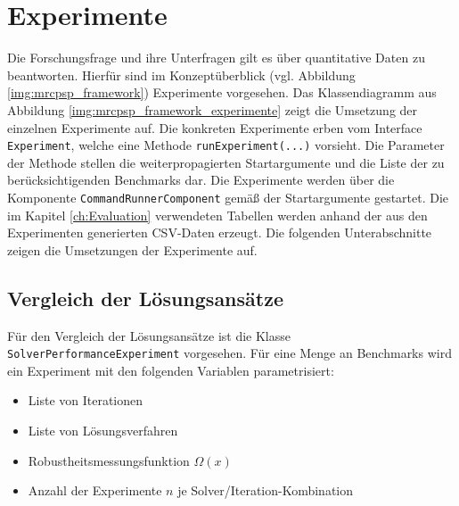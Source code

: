 \section{Experimente}
\label{sec:Experimente}

Die Forschungsfrage und ihre Unterfragen gilt es über quantitative Daten zu beantworten. Hierfür sind im Konzeptüberblick (vgl. Abbildung \ref{img:mrcpsp_framework}) Experimente vorgesehen. Das Klassendiagramm aus Abbildung \ref{img:mrcpsp_framework_experimente} zeigt die Umsetzung der einzelnen Experimente auf. Die konkreten Experimente erben vom Interface \lstinline|Experiment|, welche eine Methode \lstinline|runExperiment(...)| vorsieht. Die Parameter der Methode stellen die weiterpropagierten Startargumente und die Liste der zu berücksichtigenden Benchmarks dar. Die Experimente werden über die Komponente \lstinline|CommandRunnerComponent| gemäß der Startargumente gestartet. Die im Kapitel \ref{ch:Evaluation} verwendeten Tabellen werden anhand der aus den Experimenten generierten CSV-Daten erzeugt. Die folgenden Unterabschnitte zeigen die Umsetzungen der Experimente auf.

\subsection{Vergleich der Lösungsansätze} \label{subsec:VergleichLösungsansätze}

Für den Vergleich der Lösungsansätze ist die Klasse \lstinline|SolverPerformanceExperiment| vorgesehen. Für eine Menge an Benchmarks wird ein Experiment mit den folgenden Variablen parametrisiert:

\begin{itemize}
    \item Liste von Iterationen
    \item Liste von Lösungsverfahren
    \item Robustheitsmessungsfunktion $\Omega(x)$
    \item Anzahl der Experimente $n$ je Solver/Iteration-Kombination
\end{itemize}

